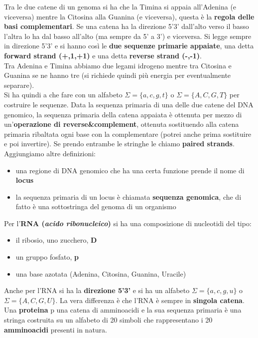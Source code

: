 \documentclass[a4paper,12pt, oneside]{book}
\begin{document}
Tra le due catene di un genoma si ha che la Timina si appaia all'Adenina (e
viceversa) mentre la Citosina alla Guanina (e viceversa), questa è la
\textbf{regola delle basi complementari}. Se una catena ha la
direzione 5'3' dall'alto verso il basso l'altra lo ha dal basso all'alto (ma
sempre da 5' a 3') e viceversa. Si legge sempre in direzione 5'3' e si hanno
così le \textbf{due sequenze primarie appaiate}, una detta \textbf{forward
  strand (+,1,+1)} e una detta \textbf{reverse strand (-,-1)}.\\
Tra Adenina e Timina abbiamo due legami idrogeno mentre tra Citosina e Guanina
se ne hanno tre (si richiede quindi più energia per eventualmente separare).\\
Si ha quindi a che fare con un alfabeto $\Sigma=\{a,c,g,t\}$ o
$\Sigma=\{A,C,G,T\}$ per costruire le sequenze. Data la sequenza primaria di una
delle due catene del DNA genomico, la sequenza primaria della catena appaiata è
ottenuta per mezzo di un'\textbf{operazione di reverse\&complement}, ottenuta
sostituendo alla catena primaria ribaltata ogni base con la complementare
(potrei anche prima sostituire e poi invertire). Se
prendo entrambe le stringhe le chiamo \textbf{paired strands}.\\
Aggiungiamo altre definizioni:
\begin{itemize}
  \item una regione di DNA genomico che ha una certa funzione prende il nome di
  \textbf{locus}
  \item la sequenza primaria di un locus è chiamata \textbf{sequenza genomica},
  che di fatto è una sottostringa del genoma di un organismo
\end{itemize}
Per l'\textbf{RNA (\textit{acido ribonucleico})} si ha una composizione di
nucleotidi del tipo:
\begin{itemize}
  \item il ribosio, uno zucchero, \textbf{D}
  \item un gruppo fosfato, \textbf{p}
  \item una base azotata (Adenina, Citosina, Guanina, Uracile)
\end{itemize}
Anche per l'RNA si ha la \textbf{direzione 5'3'} e si ha un alfabeto
$\Sigma=\{a,c,g,u\}$ o $\Sigma=\{A,C,G,U\}$. La vera differenza è che l'RNA è
sempre in \textbf{singola catena}.\\
Una \textbf{proteina} p una catena di amminoacidi e la sua sequenza primaria è
una stringa costruita su un alfabeto di 20 simboli che rappresentano i 20
\textbf{amminoacidi} presenti in natura.
\end{document}
